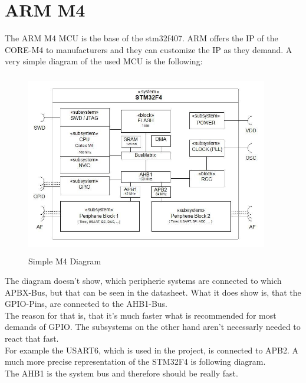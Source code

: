 \chapter{ARM M4}
The ARM M4 MCU is the base of the stm32f407. ARM offers the IP of the
CORE-M4 to manufacturers and they can customize the IP as they demand.
A very simple diagram of the used MCU is the following:\\

\begin{figure}[ht]
	\centering
	\includegraphics[width=400px,height=300px]{../img/stm32f4_prinzip.jpeg}
	\caption{Simple M4 Diagram}
	\label{m4_simple}
\end{figure}

The diagram doesn't show, which peripherie systems are connected to which
APBX-Bus, but that can be seen in the datasheet. What it does show is, that
the GPIO-Pins, are connected to the AHB1-Bus.\\
The reason for that is, that it's much faster what is recommended
 for most demands of GPIO. The subsystems on the other hand aren't
 necessarly needed to react that fast.\\

For example the USART6, which is used in the project, is connected to APB2.
A much more precise representation of the STM32F4 is following diagram.\\

The AHB1 is the system bus and therefore should be really fast.

